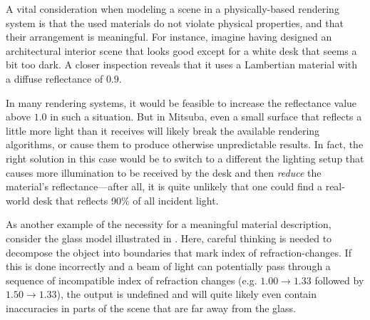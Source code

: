 A vital consideration when modeling a scene in a physically-based rendering 
system is that the used materials do not violate physical properties, and 
that their arrangement is meaningful. For instance, imagine having designed
an architectural interior scene that looks good except for a white desk that 
seems a bit too dark. A closer inspection reveals that it uses a Lambertian 
material with a diffuse reflectance of $0.9$. 

In many rendering systems, it would be feasible to increase the 
reflectance value above $1.0$ in such a situation. But in Mitsuba, even a 
small surface that reflects a little more light than it receives will 
likely break the available rendering algorithms, or cause them to produce otherwise 
unpredictable results. In fact, the right solution in this case would be to switch to
a different the lighting setup that causes more illumination to be received by
the desk and then \emph{reduce} the material's reflectance---after all, it is quite unlikely that 
one could find a real-world desk that reflects 90\% of all incident light.

As another example of the necessity for a meaningful material description, consider
the glass model illustrated in . Here, careful thinking 
is needed to decompose the object into boundaries that mark index of 
refraction-changes. If this is done incorrectly and a beam of light can
potentially pass through a sequence of incompatible index of refraction changes (e.g. $1.00\to 1.33$
followed by $1.50\to1.33$), the output is undefined and will quite likely
even contain inaccuracies in parts of the scene that are far 
away from the glass.

